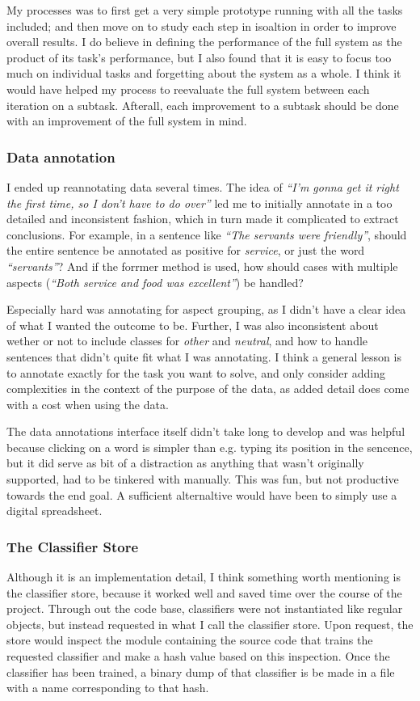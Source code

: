 \documentclass[a4paper,11pt]{kth-mag}
\begin{document}
My processes was to first get a very simple prototype running with all the tasks included; and then move on to study each step in isoaltion in order to improve overall results. I do believe in defining the performance of the full system as the product of its task's performance, but I also found that it is easy to focus too much on individual tasks and forgetting about the system as a whole. I think it would have helped my process to reevaluate the full system between each iteration on a subtask. Afterall, each improvement to a subtask should be done with an improvement of the full system in mind.

\subsubsection{Data annotation}
I ended up reannotating data several times. The idea of \emph{``I'm gonna get it right the first time, so I don't have to do over''} led me to initially annotate in a too detailed and inconsistent fashion, which in turn made it complicated to extract conclusions. For example, in a sentence like \emph{``The servants were friendly''}, should the entire sentence be annotated as positive for \emph{service}, or just the word \emph{``servants''}? And if the forrmer method is used, how should cases with multiple aspects (\emph{``Both service and food was excellent''}) be handled?

Especially hard was annotating for aspect grouping, as I didn't have a clear idea of what I wanted the outcome to be. Further, I was also inconsistent about wether or not to include classes for \emph{other} and \emph{neutral}, and how to handle sentences that didn't quite fit what I was annotating. I think a general lesson is to annotate exactly for the task you want to solve, and only consider adding complexities in the context of the purpose of the data, as added detail does come with a cost when using the data.

The data annotations interface itself didn't take long to develop and was helpful because clicking on a word is simpler than e.g. typing its position in the sencence, but it did serve as bit of a distraction as anything that wasn't originally supported, had to be tinkered with manually. This was fun, but not productive towards the end goal. A sufficient alternaltive would have been to simply use a digital spreadsheet.


\subsubsection{The Classifier Store}
Although it is an implementation detail, I think something worth mentioning is the classifier store,
because it worked well and saved time over the course of the project. Through out the code base,
classifiers were not instantiated like regular objects, but instead requested in what I call the
classifier store.
Upon request, the store would inspect the module containing the source code that trains
the requested classifier and make a hash value based on this inspection.
Once the classifier has been trained, a binary dump of that classifier is be made in a file with a name
corresponding to that hash.
\end{document}
